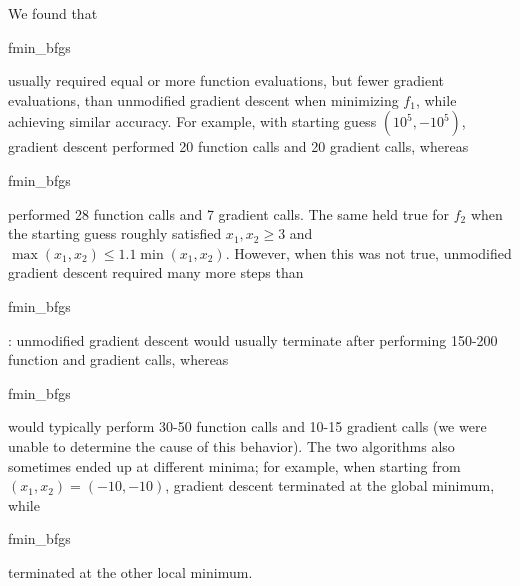 \documentclass{article}
\begin{document}
We found that \begin{tt}fmin\_bfgs\end{tt} usually required equal or more function evaluations, but fewer gradient evaluations, than unmodified gradient descent when minimizing $f_1$, while achieving similar accuracy. For example, with starting guess $(10^5, -10^5)$, gradient descent performed 20 function calls and 20 gradient calls, whereas \begin{tt}fmin\_bfgs\end{tt} performed 28 function calls and 7 gradient calls. The same held true for $f_2$ when the starting guess roughly satisfied $x_1, x_2 \ge 3$ and $\max (x_1, x_2) \le 1.1\min (x_1, x_2)$. However, when this was not true, unmodified gradient descent required many more steps than \begin{tt}fmin\_bfgs\end{tt}: unmodified gradient descent would usually terminate after performing 150-200 function and gradient calls, whereas \begin{tt}fmin\_bfgs\end{tt} would typically perform 30-50 function calls and 10-15 gradient calls (we were unable to determine the cause of this behavior). The two algorithms also sometimes ended up at different minima; for example, when starting from $(x_1, x_2) = (-10, -10)$, gradient descent terminated at the global minimum, while \begin{tt}fmin\_bfgs\end{tt} terminated at the other local minimum.
\end{document}

